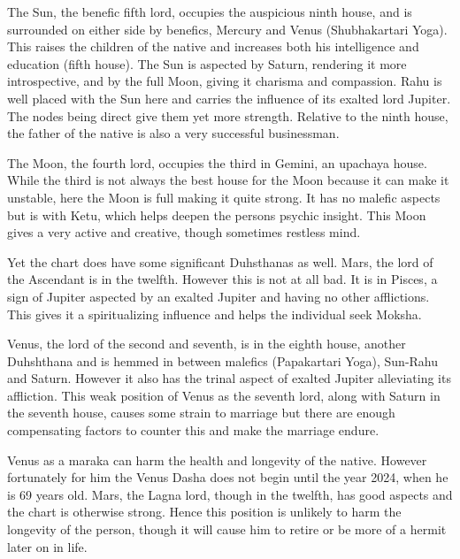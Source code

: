  

The Sun, the benefic fifth lord, occupies the auspicious ninth house, and is surrounded on either side by benefics, Mercury and Venus (Shubhakartari Yoga). This raises the children of the native and increases both his intelligence and education (fifth house). The Sun is aspected by Saturn, rendering it more introspective, and by the full Moon, giving it charisma and compassion. Rahu is well placed with the Sun here and carries the influence of its exalted lord Jupiter. The nodes being direct give them yet more strength. Relative to the ninth house, the father of the native is also a very successful businessman.

 

The Moon, the fourth lord, occupies the third in Gemini, an upachaya house. While the third is not always the best house for the Moon because it can make it unstable, here the Moon is full making it quite strong. It has no malefic aspects but is with Ketu, which helps deepen the persons psychic insight. This Moon gives a very active and creative, though sometimes restless mind.

 

Yet the chart does have some significant Duhsthanas as well. Mars, the lord of the Ascendant is in the twelfth. However this is not at all bad. It is in Pisces, a sign of Jupiter aspected by an exalted Jupiter and having no other afflictions. This gives it a spiritualizing influence and helps the individual seek Moksha.

 

Venus, the lord of the second and seventh, is in the eighth house, another Duhshthana and is hemmed in between malefics (Papakartari Yoga), Sun-Rahu and Saturn. However it also has the trinal aspect of exalted Jupiter alleviating its affliction. This weak position of Venus as the seventh lord, along with Saturn in the seventh house, causes some strain to marriage but there are enough compensating factors to counter this and make the marriage endure.

 

Venus as a maraka can harm the health and longevity of the native. However fortunately for him the Venus Dasha does not begin until the year 2024, when he is 69 years old. Mars, the Lagna lord, though in the twelfth, has good aspects and the chart is otherwise strong. Hence this position is unlikely to harm the longevity of the person, though it will cause him to retire or be more of a hermit later on in life.

